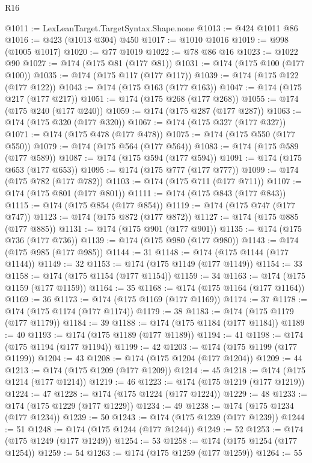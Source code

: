 \begin{lexlean}{R16}
\begin{coremodule}
@1011 := LexLeanTarget.TargetSyntax.Shape.none
@1013 := @424 @1011 @86
@1016 := @423 (@1013 @304) @450
@1017 := @1010 @1016
@1019 := @998 (@1005 @1017)
@1020 := @77 @1019
@1022 := @78 @86 @16
@1023 := @1022 @90
@1027 := @174 (@175 @81 (@177 @81))
@1031 := @174 (@175 @100 (@177 @100))
@1035 := @174 (@175 @117 (@177 @117))
@1039 := @174 (@175 @122 (@177 @122))
@1043 := @174 (@175 @163 (@177 @163))
@1047 := @174 (@175 @217 (@177 @217))
@1051 := @174 (@175 @268 (@177 @268))
@1055 := @174 (@175 @240 (@177 @240))
@1059 := @174 (@175 @287 (@177 @287))
@1063 := @174 (@175 @320 (@177 @320))
@1067 := @174 (@175 @327 (@177 @327))
@1071 := @174 (@175 @478 (@177 @478))
@1075 := @174 (@175 @550 (@177 @550))
@1079 := @174 (@175 @564 (@177 @564))
@1083 := @174 (@175 @589 (@177 @589))
@1087 := @174 (@175 @594 (@177 @594))
@1091 := @174 (@175 @653 (@177 @653))
@1095 := @174 (@175 @777 (@177 @777))
@1099 := @174 (@175 @782 (@177 @782))
@1103 := @174 (@175 @711 (@177 @711))
@1107 := @174 (@175 @801 (@177 @801))
@1111 := @174 (@175 @843 (@177 @843))
@1115 := @174 (@175 @854 (@177 @854))
@1119 := @174 (@175 @747 (@177 @747))
@1123 := @174 (@175 @872 (@177 @872))
@1127 := @174 (@175 @885 (@177 @885))
@1131 := @174 (@175 @901 (@177 @901))
@1135 := @174 (@175 @736 (@177 @736))
@1139 := @174 (@175 @980 (@177 @980))
@1143 := @174 (@175 @985 (@177 @985))
@1144 := 31
@1148 := @174 (@175 @1144 (@177 @1144))
@1149 := 32
@1153 := @174 (@175 @1149 (@177 @1149))
@1154 := 33
@1158 := @174 (@175 @1154 (@177 @1154))
@1159 := 34
@1163 := @174 (@175 @1159 (@177 @1159))
@1164 := 35
@1168 := @174 (@175 @1164 (@177 @1164))
@1169 := 36
@1173 := @174 (@175 @1169 (@177 @1169))
@1174 := 37
@1178 := @174 (@175 @1174 (@177 @1174))
@1179 := 38
@1183 := @174 (@175 @1179 (@177 @1179))
@1184 := 39
@1188 := @174 (@175 @1184 (@177 @1184))
@1189 := 40
@1193 := @174 (@175 @1189 (@177 @1189))
@1194 := 41
@1198 := @174 (@175 @1194 (@177 @1194))
@1199 := 42
@1203 := @174 (@175 @1199 (@177 @1199))
@1204 := 43
@1208 := @174 (@175 @1204 (@177 @1204))
@1209 := 44
@1213 := @174 (@175 @1209 (@177 @1209))
@1214 := 45
@1218 := @174 (@175 @1214 (@177 @1214))
@1219 := 46
@1223 := @174 (@175 @1219 (@177 @1219))
@1224 := 47
@1228 := @174 (@175 @1224 (@177 @1224))
@1229 := 48
@1233 := @174 (@175 @1229 (@177 @1229))
@1234 := 49
@1238 := @174 (@175 @1234 (@177 @1234))
@1239 := 50
@1243 := @174 (@175 @1239 (@177 @1239))
@1244 := 51
@1248 := @174 (@175 @1244 (@177 @1244))
@1249 := 52
@1253 := @174 (@175 @1249 (@177 @1249))
@1254 := 53
@1258 := @174 (@175 @1254 (@177 @1254))
@1259 := 54
@1263 := @174 (@175 @1259 (@177 @1259))
@1264 := 55

\end{coremodule}
\end{lexlean}
